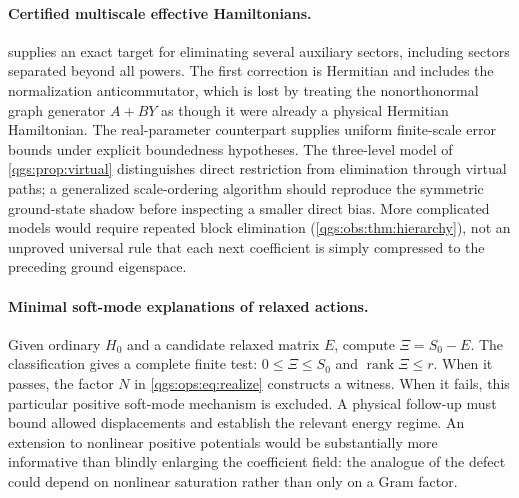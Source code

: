 \documentclass[11pt,oneside]{article}
\numberwithin{equation}{section}
\theoremstyle{plain}
\theoremstyle{definition}
\theoremstyle{remark}
\DeclareMathOperator{\rank}{rank}
\begin{document}
\paragraph{Certified multiscale effective Hamiltonians.}
 supplies an exact target for eliminating several auxiliary sectors, including sectors separated beyond all powers. The first correction is Hermitian and includes the normalization anticommutator, which is lost by treating the nonorthonormal graph generator $A+BY$ as though it were already a physical Hermitian Hamiltonian. The real-parameter counterpart supplies uniform finite-scale error bounds under explicit boundedness hypotheses. The three-level model of \cref{qgs:prop:virtual} distinguishes direct restriction from elimination through virtual paths; a generalized scale-ordering algorithm should reproduce the symmetric ground-state shadow before inspecting a smaller direct bias. More complicated models would require repeated block elimination (\cref{qgs:obs:thm:hierarchy}), not an unproved universal rule that each next coefficient is simply compressed to the preceding ground eigenspace.

\paragraph{Minimal soft-mode explanations of relaxed actions.}
Given ordinary $H_0$ and a candidate relaxed matrix $E$, compute $\Xi=S_0-E$. The classification gives a complete finite test: $0\le\Xi\le S_0$ and $\rank\Xi\le r$. When it passes, the factor $N$ in \eqref{qgs:ops:eq:realize} constructs a witness. When it fails, this particular positive soft-mode mechanism is excluded. A physical follow-up must bound allowed displacements and establish the relevant energy regime. An extension to nonlinear positive potentials would be substantially more informative than blindly enlarging the coefficient field: the analogue of the defect could depend on nonlinear saturation rather than only on a Gram factor.
\end{document}
